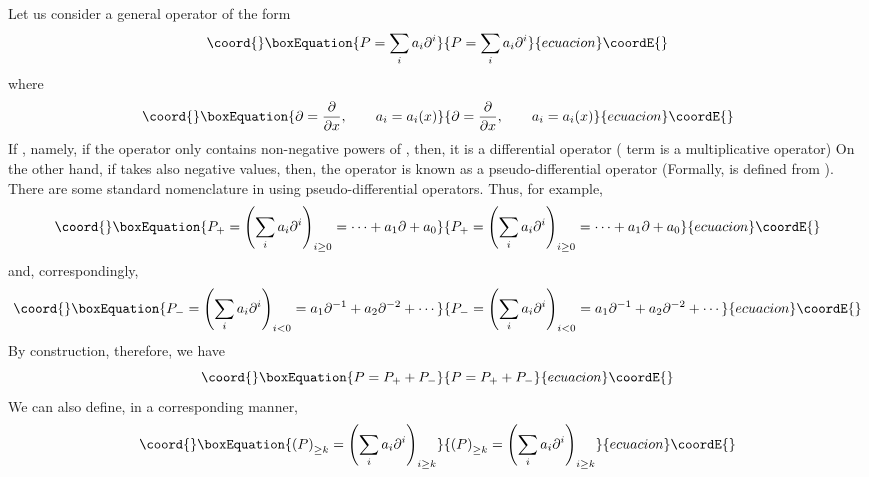 \documentclass[a4paper,11pt]{article}
\begin{document}
Let us consider a general operator of the form
\begin{equation}\coord{}\boxEquation{
P = \sum_{i} a_{i} \partial^{i}
}{
P = \sum_{i} a_{i} \partial^{i}
}{ecuacion}\coordE{}\end{equation}
where
\begin{equation}\coord{}\boxEquation{
\partial = {\partial\over \partial x},\qquad a_{i} = a_{i} (x)
}{
\partial = {\partial\over \partial x},\qquad a_{i} = a_{i} (x)
}{ecuacion}\coordE{}\end{equation}
If \coordHE{}, namely, if the operator \coordHE{} only contains non-negative
powers of \myHighlight{$\partial$}\coordHE{}, then, it is a differential operator (\coordHE{} term
is a multiplicative operator) On the other hand, if \coordHE{} takes also
negative values, then, the operator \coordHE{} is known as a
pseudo-differential operator (Formally, \coordHE{} is defined
from \coordHE{}). There are
some standard nomenclature in using pseudo-differential
operators. Thus, for example,
\begin{equation}\coord{}\boxEquation{
P_{+} = \left(\sum_{i} a_{i} \partial^{i}\right)_{i \geq 0} = \cdots +
a_{1} \partial + a_{0}
}{
P_{+} = \left(\sum_{i} a_{i} \partial^{i}\right)_{i \geq 0} = \cdots +
a_{1} \partial + a_{0}
}{ecuacion}\coordE{}\end{equation}
and, correspondingly,
\begin{equation}\coord{}\boxEquation{
P_{-} = \left(\sum_{i} a_{i} \partial^{i}\right)_{i < 0} = a_{1}
\partial^{-1} + a_{2} \partial^{-2} + \cdots
}{
P_{-} = \left(\sum_{i} a_{i} \partial^{i}\right)_{i < 0} = a_{1}
\partial^{-1} + a_{2} \partial^{-2} + \cdots
}{ecuacion}\coordE{}\end{equation}
By construction, therefore, we have
\begin{equation}\coord{}\boxEquation{
P = P_{+} + P_{-}
}{
P = P_{+} + P_{-}
}{ecuacion}\coordE{}\end{equation}
We can also define, in a corresponding manner,
\begin{equation}\coord{}\boxEquation{
\left(P\right)_{\geq k} = \left(\sum_{i} a_{i}
\partial^{i}\right)_{i\geq k}
}{
\left(P\right)_{\geq k} = \left(\sum_{i} a_{i}
\partial^{i}\right)_{i\geq k}
}{ecuacion}\coordE{}\end{equation}
\end{document}
